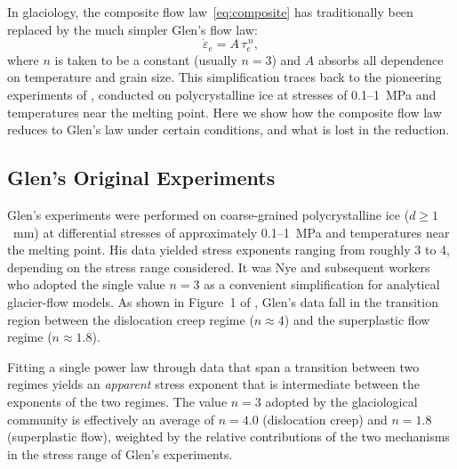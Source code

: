 \documentclass[11pt]{article}
\begin{document}
In glaciology, the composite flow law~\eqref{eq:composite} has traditionally been replaced by the much simpler Glen's flow law:
\begin{equation}
  \dot{\varepsilon}_e = A\,\tau_e^{\,n},
  \label{eq:glen_simple}
\end{equation}
where $n$ is taken to be a constant (usually $n = 3$) and $A$ absorbs all dependence on temperature and grain size.  This simplification traces back to the pioneering experiments of \cite{Glen1952,Glen1955}, conducted on polycrystalline ice at stresses of 0.1--1~MPa and temperatures near the melting point.  Here we show how the composite flow law reduces to Glen's law under certain conditions, and what is lost in the reduction.

\subsection{Glen's Original Experiments}

Glen's experiments were performed on coarse-grained polycrystalline ice ($d \geq 1$~mm) at differential stresses of approximately 0.1--1~MPa and temperatures near the melting point.  His data yielded stress exponents ranging from roughly 3 to 4, depending on the stress range considered.  It was Nye \cite{Nye1957} and subsequent workers who adopted the single value $n = 3$ as a convenient simplification for analytical glacier-flow models.  As shown in Figure~1 of \cite{GoldsbyKohlstedt2001}, Glen's data fall in the transition region between the dislocation creep regime ($n \approx 4$) and the superplastic flow regime ($n \approx 1.8$).

\medskip
\noindent Fitting a single power law through data that span a transition between two regimes yields an \textit{apparent} stress exponent that is intermediate between the exponents of the two regimes.  The value $n = 3$ adopted by the glaciological community is effectively an average of $n = 4.0$ (dislocation creep) and $n = 1.8$ (superplastic flow), weighted by the relative contributions of the two mechanisms in the stress range of Glen's experiments.
\end{document}
